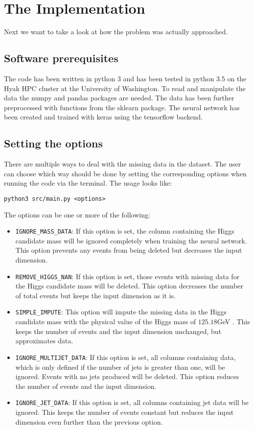 \section{The Implementation}\label{sec:code}

Next we want to take a look at how the problem was actually approached.

\subsection{Software prerequisites}\label{subsec:code:prereq}

The code has been written in python 3 and has been tested in python 3.5 on the Hyak HPC cluster at the University of Washington.
To read and manipulate the data the numpy and pandas packages are needed.
The data has been further preprocessed with functions from the sklearn package.
The neural network has been created and trained with keras using the tensorflow backend.

\subsection{Setting the options}\label{subsec:code:flags}

There are multiple ways to deal with the missing data in the dataset.
The user can choose which way should be done by setting the corresponding options when running the code via the terminal.
The usage looks like:

\texttt{python3 src/main.py <options>}

\noindent The options can be one or more of the following:

\begin{itemize}
\item \texttt{IGNORE\_MASS\_DATA}:
If this option is set, the column containing the Higgs candidate mass will be ignored completely when training the neural network. This option prevents any events from being deleted but decreases the input dimension.
\item \texttt{REMOVE\_HIGGS\_NAN}:
If this option is set, those events with missing data for the Higgs candidate mass will be deleted. This option decreases the number of total events but keeps the input dimension as it is.
\item \texttt{SIMPLE\_IMPUTE}:
This option will impute the missing data in the Higgs candidate mass with the physical value of the Higgs mass of $125.18$\;GeV \cite{tanabashi2018review}. This keeps the number of events and the input dimension unchanged, but approximates data.
\item \texttt{IGNORE\_MULTIJET\_DATA}:
If this option is set, all columns containing data, which is only defined if the number of jets is greater than one, will be ignored. Events with no jets produced will be deleted. This option reduces the number of events and the input dimension.
\item \texttt{IGNORE\_JET\_DATA}:
If this option is set, all columns containing jet data will be ignored. This keeps the number of events constant but reduces the input dimension even further than the previous option.
\end{itemize}

